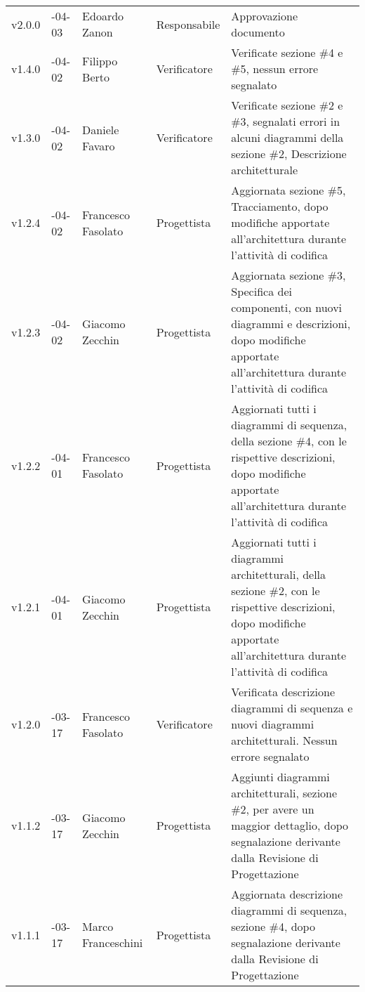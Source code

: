 \begin{longtable} { >{\centering}p{1.4cm} >{\centering}p{2cm} >{\centering}p{2.3cm} >{\centering}p{2.7cm} p{5.5cm} }
	\addlinespace[0.4em]
	\midrule
	\addlinespace[0.4em]
	v2.0.0 & 2017-04-03 &  Edoardo Zanon & Responsabile & Approvazione documento \\
	\addlinespace[0.4em]
	\midrule
	\addlinespace[0.4em]
	v1.4.0 & 2017-04-02 & Filippo Berto & Verificatore & Verificate sezione \#4 e \#5, nessun errore segnalato \\
	\addlinespace[0.4em]
	\midrule
	\addlinespace[0.4em]
	v1.3.0 & 2017-04-02 & Daniele Favaro & Verificatore & Verificate sezione \#2 e \#3, segnalati errori in alcuni diagrammi della sezione \#2, Descrizione architetturale \\
	\addlinespace[0.4em]
	\midrule
	\addlinespace[0.4em]
	v1.2.4 & 2017-04-02 & Francesco Fasolato & Progettista & Aggiornata sezione \#5, Tracciamento, dopo modifiche apportate all'architettura durante l'attività di codifica \\
	\addlinespace[0.4em]
	\midrule
	\addlinespace[0.4em]
	v1.2.3 & 2017-04-02 &  Giacomo Zecchin  & Progettista & Aggiornata sezione \#3, Specifica dei componenti, con nuovi diagrammi e descrizioni, dopo modifiche apportate all'architettura durante l'attività di codifica \\
	\addlinespace[0.4em]
	\midrule
	\addlinespace[0.4em]
	v1.2.2 & 2017-04-01 & Francesco Fasolato & Progettista & Aggiornati tutti i diagrammi di sequenza, della sezione \#4, con le rispettive descrizioni, dopo modifiche apportate all'architettura durante l'attività di codifica \\
	\addlinespace[0.4em]
	\midrule
	\addlinespace[0.4em]
	v1.2.1 & 2017-04-01 & Giacomo Zecchin & Progettista & Aggiornati tutti i diagrammi architetturali, della sezione \#2, con le rispettive descrizioni, dopo modifiche apportate all'architettura durante l'attività di codifica \\
	\addlinespace[0.4em]
	\midrule
	\addlinespace[0.4em]
	v1.2.0 & 2017-03-17 &  Francesco Fasolato & Verificatore & Verificata descrizione diagrammi di sequenza e nuovi diagrammi architetturali. Nessun errore segnalato \\
	\addlinespace[0.4em]
	\midrule
	\addlinespace[0.4em]
	v1.1.2 & 2017-03-17 &  Giacomo Zecchin & Progettista & Aggiunti diagrammi architetturali, sezione \#2, per avere un maggior dettaglio, dopo segnalazione derivante dalla Revisione di Progettazione \\
	\addlinespace[0.4em]
	\midrule
	\addlinespace[0.4em]
	v1.1.1 & 2017-03-17 &  Marco Franceschini & Progettista & Aggiornata descrizione diagrammi di sequenza, sezione \#4, dopo segnalazione derivante dalla Revisione di Progettazione \\

\end{longtable}
